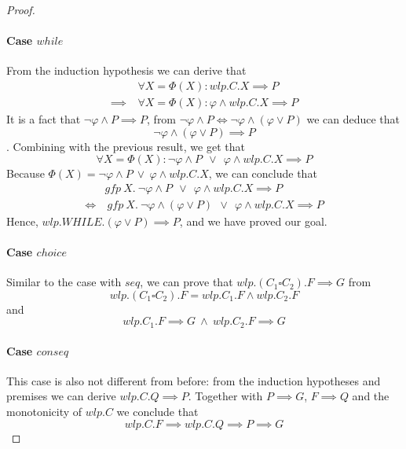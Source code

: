 \begin{proof}
	\paragraph{Case $while$}
	From the induction hypothesis we can derive that 
	\begin{align*}
		&\forall X=\Phi(X):  wlp.C.X\implies P \\
		\implies\ & \forall X=\Phi(X): \varphi\wedge wlp.C.X\implies P 
	\end{align*}
	It is a fact that $\neg\varphi\wedge P \implies P$, from $\neg\varphi\wedge P \iff \neg\varphi\wedge (\varphi\vee P)$ we can deduce that $$\neg\varphi\wedge (\varphi\vee P) \implies P$$. 
	Combining with the previous result, we get that 
	$$\forall X=\Phi(X):  \neg\varphi\wedge P  \ \ \vee \ \ \varphi \wedge wlp.C.X\implies P$$
	Because 
	$\Phi(X) = \neg\varphi\wedge P \ \vee\  \varphi\wedge wlp.C.X$, we can conclude that 
	\begin{align*}
		& gfp \ X. \  \neg\varphi\wedge P  \ \ \vee \ \ \varphi \wedge wlp.C.X\implies P\\
		\iff &\ gfp \ X. \  \neg\varphi\wedge (\varphi\vee P)  \ \ \vee \ \ \varphi \wedge wlp.C.X\implies P
	\end{align*}
	Hence, 
	$wlp.WHILE.(\varphi\vee P)\implies P$, and we have proved our goal.

	\paragraph{Case $choice$} Similar to the case with $seq$, we can prove that $wlp.(C_1\square C_2).F \implies G$ from 
	$$wlp.(C_1\square C_2).F = wlp.C_1.F \wedge wlp.C_2.F$$
	and 
	$$wlp.C_1.F \implies G\ \wedge\ wlp.C_2.F \implies G$$

	\paragraph{Case $conseq$}
	This case is also not different from before: from the induction hypotheses and premises we can derive $wlp.C.Q \implies P$. 
	Together with $P\implies G$, $F\implies Q$ and the monotonicity of $wlp.C$ we conclude that 
	$$wlp.C.F\implies wlp.C.Q \implies P \implies G$$
\end{proof}




